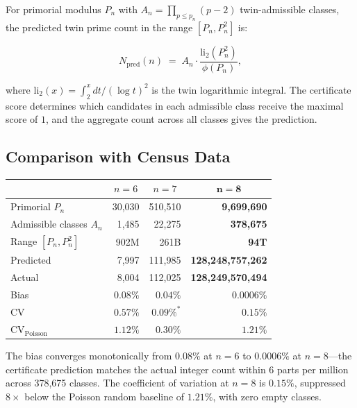 \documentclass[11pt]{article}
\begin{document}
For primorial modulus $P_n$ with $A_n = \prod_{p \le p_n}(p-2)$ twin-admissible
classes, the predicted twin prime count in the range $[P_n, P_n^{\!2}]$ is:

\begin{equation}
N_\mathrm{pred}(n) \;=\; A_n \cdot \frac{\mathrm{li}_2(P_n^{\!2})}{\phi(P_n)},
\end{equation}

\noindent where $\mathrm{li}_2(x) = \int_2^x dt/(\log t)^2$ is the twin logarithmic
integral. The certificate score determines which candidates in each admissible
class receive the maximal score of $1$, and the aggregate count across all classes
gives the prediction.

\subsection{Comparison with Census Data}

{\centering
\begin{tabular}{@{}lrrr@{}}
\toprule
& \multicolumn{1}{c}{$n=6$}
& \multicolumn{1}{c}{$n=7$}
& \multicolumn{1}{c}{$\mathbf{n=8}$} \\
\midrule
Primorial $P_n$ & 30{,}030 & 510{,}510 & \textbf{9{,}699{,}690} \\
Admissible classes $A_n$ & 1{,}485 & 22{,}275 & \textbf{378{,}675} \\
Range $[P_n, P_n^{\!2}]$ & 902M & 261B & \textbf{94T} \\
Predicted & 7{,}997 & 111{,}985 & \textbf{128{,}248{,}757{,}262} \\
Actual & 8{,}004 & 112{,}025 & \textbf{128{,}249{,}570{,}494} \\
Bias & $0.08\%$ & $0.04\%$ & $\mathbf{0.0006\%}$ \\
CV & $0.57\%$ & $0.09\%^{*}$ & $\mathbf{0.15\%}$ \\
CV$_\mathrm{Poisson}$ & $1.12\%$ & $0.30\%$ & $\mathbf{1.21\%}$ \\
\bottomrule
\end{tabular}
\par}

\vspace{0.5em}

\vspace{1em}

\noindent The bias converges monotonically from $0.08\%$ at $n=6$ to $0.0006\%$ at $n=8$---the certificate prediction matches the actual integer
count within 6 parts per million across 378{,}675 classes. The coefficient
of variation at $n=8$ is $0.15\%$, suppressed $8\times$ below the Poisson
random baseline of $1.21\%$, with zero empty classes.
\end{document}
